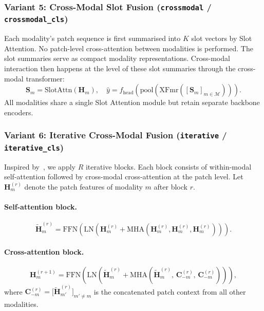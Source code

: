\documentclass[11pt,a4paper]{article}
\begin{document}
\subsubsection{Variant 5: Cross-Modal Slot Fusion (\texttt{crossmodal} / \texttt{crossmodal\_cls})}

Each modality's patch sequence is first summarised into $K$ slot vectors by
Slot Attention.
No patch-level cross-attention between modalities is performed.
The slot summaries serve as compact modality representations.
Cross-modal interaction then happens at the level of these slot summaries
through the cross-modal transformer:
\begin{equation}
    \mathbf{S}_m = \text{SlotAttn}(\mathbf{H}_m), \quad
    \hat{y} = f_\text{head}\!\left(
        \text{pool}\!\left(
            \mathrm{XFmr}\!\left(
                [\mathbf{S}_m]_{m\in\mathcal{M}}
            \right)
        \right)\right).
\end{equation}
All modalities share a single Slot Attention module but retain separate
backbone encoders.

\subsubsection{Variant 6: Iterative Cross-Modal Fusion (\texttt{iterative} / \texttt{iterative\_cls})}

Inspired by~\cite{jaegle2021perceiver,tsai2019multimodal}, we apply $R$
iterative blocks.
Each block consists of within-modal self-attention followed by cross-modal
cross-attention at the patch level.
Let $\mathbf{H}_m^{(r)}$ denote the patch features of modality $m$ after
block $r$.

\paragraph{Self-attention block.}
\begin{equation}
    \tilde{\mathbf{H}}_m^{(r)} = \mathrm{FFN}\!\left(
        \mathrm{LN}\!\left(
            \mathbf{H}_m^{(r)} + \mathrm{MHA}(
                \mathbf{H}_m^{(r)},
                \mathbf{H}_m^{(r)},
                \mathbf{H}_m^{(r)})\right)\right).
\end{equation}

\paragraph{Cross-attention block.}
\begin{equation}
    \mathbf{H}_m^{(r+1)} = \mathrm{FFN}\!\left(
        \mathrm{LN}\!\left(
            \tilde{\mathbf{H}}_m^{(r)} + \mathrm{MHA}\!\left(
                \tilde{\mathbf{H}}_m^{(r)},\,
                \mathbf{C}_{-m}^{(r)},\,
                \mathbf{C}_{-m}^{(r)}
            \right)\right)\right),
    \label{eq:iterative_ca}
\end{equation}
where $\mathbf{C}_{-m}^{(r)} = \bigl[\tilde{\mathbf{H}}_{m'}^{(r)}\bigr]_{m'\neq m}$
is the concatenated patch context from all other modalities.
\end{document}
